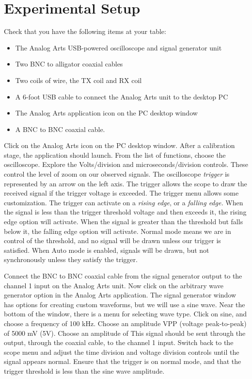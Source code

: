 \documentclass[12pt,twocolumn]{article}
\begin{document}
\section{Experimental Setup}

\noindent
Check that you have the following items at your table:
\begin{itemize}
\item The Analog Arts USB-powered oscilloscope and signal generator unit
\item Two BNC to alligator coaxial cables
\item Two coils of wire, the TX coil and RX coil
\item A 6-foot USB cable to connect the Analog Arts unit to the desktop PC
\item The Analog Arts application icon on the PC desktop window
\item A BNC to BNC coaxial cable.
\end{itemize}

Click on the Analog Arts icon on the PC desktop window.  After a calibration stage, the application should launch.  From the list of functions, choose the oscilloscope.  Explore the Volts/division and microseconds/division controls.  These control the level of zoom on our observed signals.  The oscilloscope \textit{trigger} is represented by an arrow on the left axis.  The trigger allows the scope to draw the received signal if the trigger voltage is exceeded.  The trigger menu allows some customization.  The trigger can activate on a \textit{rising edge}, or a \textit{falling edge.}  When the signal is less than the trigger threshold voltage and then exceeds it, the rising edge option will activate.  When the signal is greater than the threshold but falls below it, the falling edge option will activate.  Normal mode means we are in control of the threshold, and no signal will be drawn unless our trigger is satisfied.  When Auto mode is enabled, signals will be drawn, but not synchronously unless they satisfy the trigger.

Connect the BNC to BNC coaxial cable from the signal generator output to the channel 1 input on the Analog Arts unit.  Now click on the arbitrary wave generator option in the Analog Arts application.  The signal generator window has options for creating custom waveforms, but we will use a sine wave.  Near the bottom of the window, there is a menu for selecting wave type.  Click on sine, and choose a frequency of 100 kHz.  Choose an amplitude VPP (voltage peak-to-peak) of 5000 mV (5V).  Choose an amplitude of This signal should be sent through the output, through the coaxial cable, to the  channel 1 input.  Switch back to the scope menu and adjust the time division and voltage division controls until the signal appears normal.  Ensure that the trigger is on normal mode, and that the trigger threshold is less than the sine wave amplitude.
\end{document}
